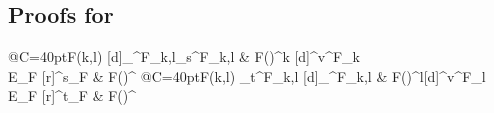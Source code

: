 \documentclass[3p]{elsarticle}
\theoremstyle{remark}
\theoremstyle{definition}
\begin{document}
\subsection{Proofs for }

\noindent 
\begin{minipage}[r]{.75\linewidth}
\equi*
\end{minipage}\hfill 
\begin{minipage}[l]{.25\linewidth}
	\xymatrix@R=10pt@C=40pt{F(k,l) \ar@{>->}[d]_{\iota^F_{k,l}}\ar[r]_{s^F_{k,l}} & F(\bullet)^k \ar@{>->}[d]^{v^F_k} \\ E_F ^{s_F} & F(\bullet)^\star}
	\xymatrix@R=10pt@C=40pt{F(k,l) \ar[r]_{t^F_{k,l}} \ar@{>->}[d]_{\iota^F_{k,l}} & F(\bullet)^l\ar@{>->}[d]^{v^F_l}  \\ E_F ^{t_F} & F(\bullet)^\star}
\end{minipage}
\end{document}
